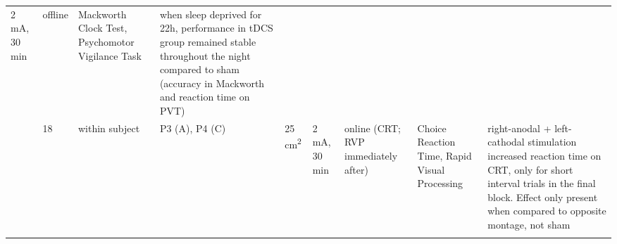 \documentclass[11pt,]{memoir}
\begin{document}
\begin{longtable}[]{@{}lllllllll@{}}
\begin{minipage}[t]{0.05\columnwidth}
2 mA, 30
min\strut
\end{minipage} & \begin{minipage}[t]{0.06\columnwidth}\raggedright
offline\strut
\end{minipage} & \begin{minipage}[t]{0.11\columnwidth}\raggedright
Mackworth Clock Test,
Psychomotor Vigilance
Task\strut
\end{minipage} & \begin{minipage}[t]{0.24\columnwidth}\raggedright
when sleep deprived for 22h, performance in tDCS group
remained stable throughout the night compared to sham
(accuracy in Mackworth and reaction time on PVT)\strut
\end{minipage}\tabularnewline
\begin{minipage}[t]{0.08\columnwidth}\raggedright
\textcite{Li2015a}\strut
\end{minipage} & \begin{minipage}[t]{0.02\columnwidth}\raggedright
18\strut
\end{minipage} & \begin{minipage}[t]{0.04\columnwidth}\raggedright
within
subject\strut
\end{minipage} & \begin{minipage}[t]{0.13\columnwidth}\raggedright
P3 (A), P4 (C)\strut
\end{minipage} & \begin{minipage}[t]{0.03\columnwidth}\raggedright
25
cm\textsuperscript{2}\strut
\end{minipage} & \begin{minipage}[t]{0.05\columnwidth}\raggedright
2 mA, 30
min\strut
\end{minipage} & \begin{minipage}[t]{0.06\columnwidth}\raggedright
online
(CRT;
RVP
immediately
after)\strut
\end{minipage} & \begin{minipage}[t]{0.11\columnwidth}\raggedright
Choice Reaction Time,
Rapid Visual Processing\strut
\end{minipage} & \begin{minipage}[t]{0.24\columnwidth}\raggedright
right-anodal + left-cathodal stimulation increased
reaction time on CRT, only for short interval trials in
the final block. Effect only present when compared to
opposite montage, not sham\strut
\end{minipage}\tabularnewline
\begin{minipage}[t]{0.08\columnwidth}\raggedright

\end{minipage}
\end{longtable}
\end{document}
